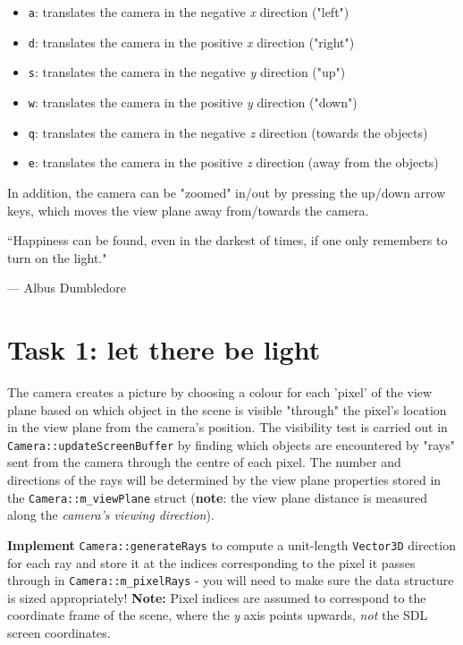 \documentclass{../../../fal_assignment}
\begin{document}
\begin{itemize}
	\item \lstinline{a}: translates the camera in the negative \textit{x} direction ("left")
	\item \lstinline{d}: translates the camera in the positive \textit{x} direction ("right")
	\item \lstinline{s}: translates the camera in the negative \textit{y} direction ("up")
	\item \lstinline{w}: translates the camera in the positive \textit{y} direction ("down")
	\item \lstinline{q}:  translates the camera in the negative \textit{z} direction (towards the objects)
	\item \lstinline{e}:  translates the camera in the positive \textit{z} direction (away from the objects)
\end{itemize}

In addition, the camera can be "zoomed" in/out by pressing the up/down arrow keys, which moves the view plane away from/towards the camera.

\begin{marginquote}
``Happiness can be found, even in the darkest of times, if one only remembers to turn on the light."

\par --- Albus Dumbledore
\end{marginquote}

\section*{Task 1: let there be light}

The camera creates a picture by choosing a colour for each 'pixel' of the view plane based on which object in the scene is visible "through" the pixel's location in the view plane from the camera's position. The visibility test is carried out in \lstinline{Camera::updateScreenBuffer} by finding which objects are encountered by "rays" sent from the camera through the centre of each pixel. The number and directions of the rays will be determined by the view plane properties stored in the \lstinline{Camera::m_viewPlane} struct (\textbf{note}: the view plane distance is measured along the \textit{camera's viewing direction}).

\textbf{Implement} \lstinline{Camera::generateRays} to compute a unit-length \lstinline{Vector3D} direction for each ray and store it at the indices corresponding to the pixel it passes through in \lstinline{Camera::m_pixelRays} - you will need to make sure the data structure is sized appropriately!
\textbf{Note:} Pixel indices are assumed to correspond to the coordinate frame of the scene, where the \textit{y} axis points upwards, \textit{not} the SDL screen coordinates.
\end{document}
